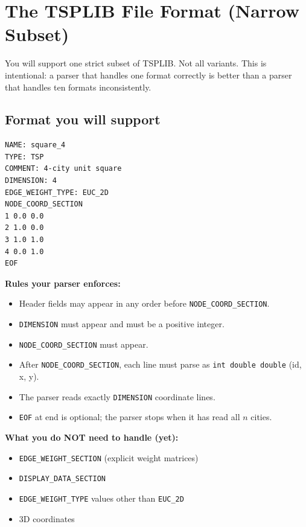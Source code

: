 \section{The TSPLIB File Format (Narrow Subset)}

You will support one strict subset of TSPLIB. Not all variants. This is intentional: a parser that handles one format correctly is better than a parser that handles ten formats inconsistently.

\subsection{Format you will support}

\begin{lstlisting}[style=cstyle, language={}, numbers=none]
NAME: square_4
TYPE: TSP
COMMENT: 4-city unit square
DIMENSION: 4
EDGE_WEIGHT_TYPE: EUC_2D
NODE_COORD_SECTION
1 0.0 0.0
2 1.0 0.0
3 1.0 1.0
4 0.0 1.0
EOF
\end{lstlisting}

\textbf{Rules your parser enforces:}
\begin{itemize}
  \item Header fields may appear in any order before \texttt{NODE\_COORD\_SECTION}.
  \item \texttt{DIMENSION} must appear and must be a positive integer.
  \item \texttt{NODE\_COORD\_SECTION} must appear.
  \item After \texttt{NODE\_COORD\_SECTION}, each line must parse as \texttt{int double double} (id, x, y).
  \item The parser reads exactly \texttt{DIMENSION} coordinate lines.
  \item \texttt{EOF} at end is optional; the parser stops when it has read all $n$ cities.
\end{itemize}

\textbf{What you do NOT need to handle (yet):}
\begin{itemize}
  \item \texttt{EDGE\_WEIGHT\_SECTION} (explicit weight matrices)
  \item \texttt{DISPLAY\_DATA\_SECTION}
  \item \texttt{EDGE\_WEIGHT\_TYPE} values other than \texttt{EUC\_2D}
  \item 3D coordinates
\end{itemize}

